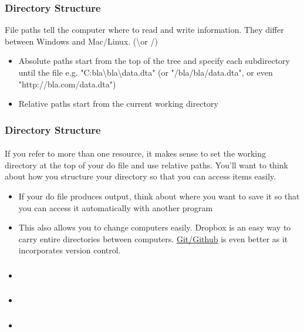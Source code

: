 \documentclass{beamer}
\begin{document}
\begin{frame}
  \frametitle{Directory Structure}
  File paths tell the computer where to read and write information. They differ between Windows and Mac/Linux. (\textbackslash or /)
  \begin{itemize}
    \item Absolute paths start from the top of the tree and specify each subdirectory until the file e.g. "C:bla\textbackslash bla\textbackslash data.dta" (or "/bla/bla/data.dta", or even "http://bla.com/data.dta")
    \item Relative paths start from the current working directory
  \end{itemize}
\end{frame}

\begin{frame}
  \frametitle{Directory Structure}
  \framesubtitle{}
  If you refer to more than one resource, it makes sense to set the working directory at the top of your do file and use relative paths. You'll want to think about how you structure your directory so that you can access items easily.
  \begin{itemize}
    \item If your do file produces output, think about where you want to save it so that you can access it automatically with another program
    \item This also allows you to change computers easily. Dropbox is an easy way to carry entire directories between computers. \href{https://desktop.github.com/}{Git/Github} is even better as it incorporates version control.
  \end{itemize}
\end{frame}

\begin{frame}
  \frametitle{}
  \framesubtitle{}
  \begin{itemize}
    \item 
  \end{itemize}
\end{frame}

\begin{frame}
  \frametitle{}
  \framesubtitle{}
  \begin{itemize}
    \item 
  \end{itemize}
\end{frame}

\begin{frame}
  \frametitle{}
  \framesubtitle{}
  \begin{itemize}
    \item 
  \end{itemize}
\end{frame}
\end{document}
